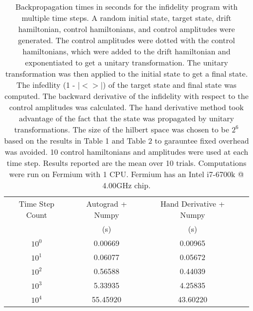 \documentclass[letterpaper, 12pt]{article}
\begin{document}
\begin{table}
  \begin{center}
    \begin{tabular}{c | c | c | c}
      Time Step Count & Autograd + Numpy & Hand Derivative + Numpy\\
                      & (s)              & (s)\\
      \hline
      $10^{0}$        &  0.00669          &  0.00965\\
      $10^{1}$        &  0.06077          &  0.05672\\
      $10^{2}$        &  0.56588          &  0.44039\\
      $10^{3}$        &  5.33935          &  4.25835\\
      $10^{4}$        & 55.45920          & 43.60220\\
    \end{tabular}
  \end{center}
  \caption{Backpropagation times in seconds for the infidelity program with multiple time steps. A random initial state, target state, drift hamiltonian, control hamiltonians, and control amplitudes were generated. The control amplitudes were dotted with the control hamiltonians, which were added to the drift hamiltonian and exponentiated to get a unitary transformation. The unitary transformation was then applied to the initial state to get a final state. The infedlity (1 - $|<>|$) of the target state and final state was computed. The backward derivative of the infidelity with respect to the control amplitudes was calculated. The hand derivative method took advantage of the fact that the state was propagated by unitary transformations. The size of the hilbert space was chosen to be $2^{6}$ based on the results in Table 1 and Table 2 to garauntee fixed overhead was avoided. 10 control hamiltonians and amplitudes were used at each time step. Results reported are the mean over 10 trials. Computations were run on Fermium with 1 CPU. Fermium has an Intel i7-6700k @ 4.00GHz chip.}
\end{table}
\end{document}

